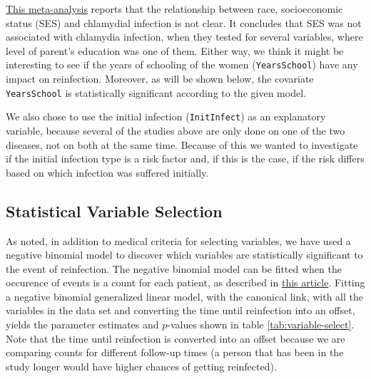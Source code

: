 \documentclass[
]{article}
\begin{document}
\href{https://www.ncbi.nlm.nih.gov/pmc/articles/PMC2094865/}{This meta-analysis} reports that the relationship between race, socioeconomic status (SES) and chlamydial infection is not clear. It concludes that SES was not associated with chlamydia infection, when they tested for several variables, where level of parent's education was one of them. Either way, we think it might be interesting to see if the years of schooling of the women (\texttt{YearsSchool}) have any impact on reinfection. Moreover, as will be shown below, the covariate \texttt{YearsSchool} is statistically significant according to the given model.

We also chose to use the initial infection (\texttt{InitInfect}) as an explanatory variable, because several of the studies above are only done on one of the two diseases, not on both at the same time. Because of this we wanted to investigate if the initial infection type is a risk factor and, if this is the case, if the risk differs based on which infection was suffered initially.

\hypertarget{statistical-variable-selection}{%
\subsection{Statistical Variable Selection}\label{statistical-variable-selection}}

As noted, in addition to medical criteria for selecting variables, we have used a negative binomial model to discover which variables are statistically significant to the event of reinfection. The negative binomial model can be fitted when the occurence of events is a count for each patient, as described in \href{https://pubmed.ncbi.nlm.nih.gov/22083507/}{this article}. Fitting a negative binomial generalized linear model, with the canonical link, with all the variables in the data set and converting the time until reinfection into an offset, yields the parameter estimates and \(p\)-values shown in table \ref{tab:variable-select}. Note that the time until reinfection is converted into an offset because we are comparing counts for different follow-up times (a person that has been in the study longer would have higher chances of getting reinfected).
\end{document}
